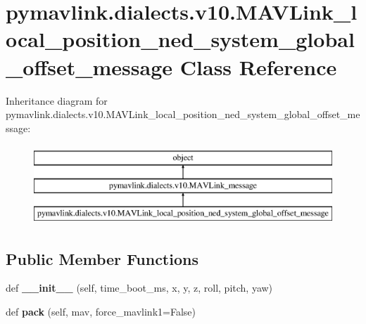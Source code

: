 \hypertarget{classpymavlink_1_1dialects_1_1v10_1_1MAVLink__local__position__ned__system__global__offset__message}{}\section{pymavlink.\+dialects.\+v10.\+M\+A\+V\+Link\+\_\+local\+\_\+position\+\_\+ned\+\_\+system\+\_\+global\+\_\+offset\+\_\+message Class Reference}
\label{classpymavlink_1_1dialects_1_1v10_1_1MAVLink__local__position__ned__system__global__offset__message}
Inheritance diagram for pymavlink.\+dialects.\+v10.\+M\+A\+V\+Link\+\_\+local\+\_\+position\+\_\+ned\+\_\+system\+\_\+global\+\_\+offset\+\_\+message\+:\begin{figure}[H]
\begin{center}
\leavevmode
\includegraphics[height=3.000000cm]{classpymavlink_1_1dialects_1_1v10_1_1MAVLink__local__position__ned__system__global__offset__message}
\end{center}
\end{figure}
\subsection*{Public Member Functions}
\begin{DoxyCompactItemize}
\item 
\mbox{\label{classpymavlink_1_1dialects_1_1v10_1_1MAVLink__local__position__ned__system__global__offset__message_aef15e007116046b4b2cdea5f606225f4}} 
def {\bfseries \+\_\+\+\_\+init\+\_\+\+\_\+} (self, time\+\_\+boot\+\_\+ms, x, y, z, roll, pitch, yaw)
\item 
\mbox{\label{classpymavlink_1_1dialects_1_1v10_1_1MAVLink__local__position__ned__system__global__offset__message_a6eabdd05eb0b9a1563dde230012564a8}} 
def {\bfseries pack} (self, mav, force\+\_\+mavlink1=False)
\end{DoxyCompactItemize}
